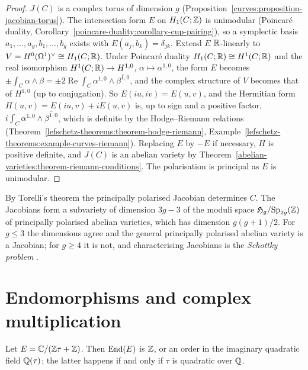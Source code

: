 \begin{proof}
$J(C)$ is a complex torus of dimension $g$ (Proposition~\ref{curves:proposition-jacobian-torus}). The intersection form $E$ on $H_1(C; \mathbb{Z})$ is unimodular (Poincar\'e duality,
Corollary~\ref{poincare-duality:corollary-cup-pairing}), so a symplectic basis $a_1, \ldots, a_g, b_1, \ldots, b_g$ exists with $E(a_j, b_k) = \delta_{jk}$. Extend $E$ $\mathbb{R}$-linearly to
$V = H^0(\Omega^1)^\vee \cong H_1(C; \mathbb{R})$. Under Poincar\'e duality $H_1(C; \mathbb{R}) \cong H^1(C; \mathbb{R})$ and the real isomorphism $H^1(C; \mathbb{R}) \to H^{1,0}$, $\alpha \mapsto \alpha^{1,0}$,
the form $E$ becomes $\pm\int_C\alpha \wedge \beta = \pm 2\operatorname{Re}\int_C\alpha^{1,0} \wedge \overline{\beta^{1,0}}$, and the complex structure of $V$ becomes that of $H^{1,0}$ (up to
conjugation). So $E(iu, iv) = E(u, v)$, and the Hermitian form $H(u, v) = E(iu, v) + iE(u, v)$ is, up to sign and a positive factor, $i\int_C\alpha^{1,0} \wedge \overline{\beta^{1,0}}$, which
is definite by the Hodge--Riemann relations (Theorem~\ref{lefschetz-theorems:theorem-hodge-riemann}, Example~\ref{lefschetz-theorems:example-curves-riemann}). Replacing $E$ by $-E$ if
necessary, $H$ is positive definite, and $J(C)$ is an abelian variety by Theorem~\ref{abelian-varieties:theorem-riemann-conditions}. The polarisation is principal as $E$ is unimodular.
\end{proof}

\begin{remark}\label{abelian-varieties:remark-torelli-schottky}
By Torelli's theorem the principally polarised Jacobian determines $C$. The Jacobians form a subvariety of dimension $3g - 3$ of the moduli space $\mathfrak{H}_g/\mathrm{Sp}_{2g}(\mathbb{Z})$ of
principally polarised abelian varieties, which has dimension $g(g + 1)/2$. For $g \leq 3$ the dimensions agree and the general principally polarised abelian variety is a Jacobian;
for $g \geq 4$ it is not, and characterising Jacobians is the \emph{Schottky problem} \cite{birkenhake-lange}.
\end{remark}

\section{Endomorphisms and complex multiplication}\label{abelian-varieties:section-endomorphisms}

\begin{proposition}\label{abelian-varieties:proposition-elliptic-endomorphisms}
Let $E = \mathbb{C}/(\mathbb{Z}\tau + \mathbb{Z})$. Then $\operatorname{End}(E)$ is $\mathbb{Z}$, or an order in the imaginary quadratic field $\mathbb{Q}(\tau)$; the latter happens if and only if $\tau$ is quadratic over $\mathbb{Q}$.
\end{proposition}

